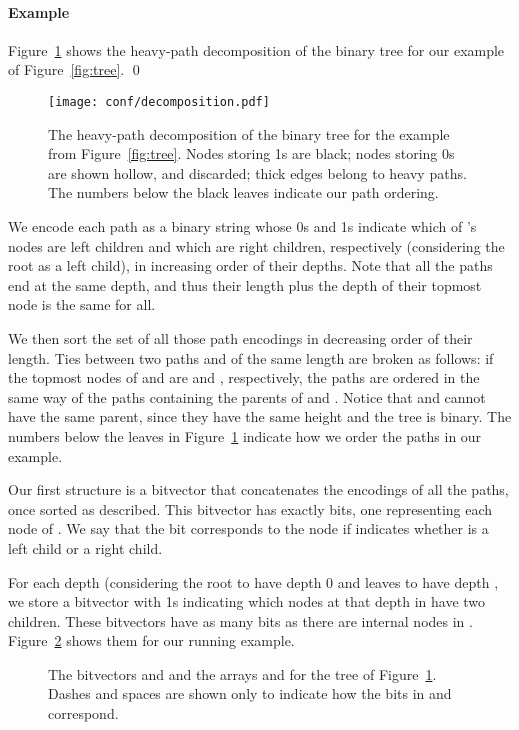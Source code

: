 \documentclass{elsarticle}
\newenvironment{example}{\paragraph{Example}}{\qed \medskip }
\begin{document}
\begin{example}
Figure~\ref{fig:decomposition} shows the heavy-path decomposition of the binary tree for our example of Figure~\ref{fig:tree}. 
\end{example}

\begin{figure}
\begin{center}
\texttt{[image: conf/decomposition.pdf]}
\caption{The heavy-path decomposition of the binary tree for the example from Figure~\ref{fig:tree}.  Nodes storing 1s are black; nodes storing 0s are shown hollow, and discarded; thick edges belong to heavy paths.  The numbers below the black leaves indicate our path ordering.}
\label{fig:decomposition}
\end{center}
\end{figure}

We encode each  path  as a binary string whose 0s and 1s indicate which of 's nodes are left children and which are right children, respectively (considering the root as a left child), in increasing order of their depths. Note that all the  paths end at the same depth, and thus their length plus the depth of their topmost node is the same for all.  

We then sort the set of all those path encodings in decreasing order of their length. Ties between two paths  and  of the same length are broken as follows: if the topmost nodes of  and  are  and , respectively, the paths are ordered in the same way of the paths containing the parents of  and . Notice that  and  cannot have the same parent, since they have the same height and the tree is binary. The numbers below the leaves in Figure~\ref{fig:decomposition} indicate how we order the paths in our example.  

Our first structure is a bitvector  that concatenates the encodings of all the  paths, once sorted as described. This bitvector has exactly  bits, one representing each node of . We say that the bit  corresponds to the node  if  indicates whether  is a left child or a right child.

For each depth  (considering the root to have depth 0 and leaves to have depth , we store a bitvector  with 1s indicating which nodes at that depth in  have two children. These bitvectors have as many bits as there are internal nodes in .  Figure~\ref{fig:HandL} shows them for our running example.

\begin{figure}[t]
{\small


\vspace*{-3mm}
}
\caption{The bitvectors  and  and the arrays  and  for the tree of Figure~\ref{fig:decomposition}. Dashes and spaces are shown only to indicate how the bits in  and  correspond.}
\label{fig:HandL}
\end{figure}
\end{document}
